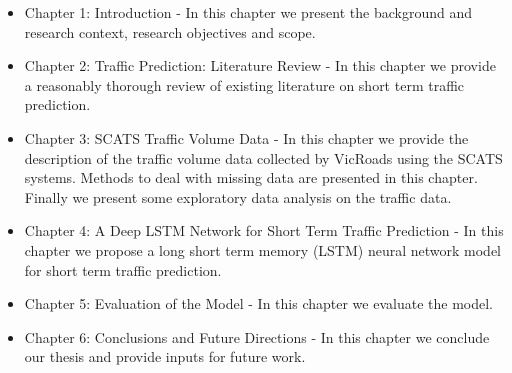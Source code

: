 \begin{itemize}
\item Chapter 1: Introduction - In this chapter we present the background and research context,
research objectives and scope.

\item Chapter 2: Traffic Prediction: Literature Review - In this chapter we provide a reasonably
thorough review of existing literature on short term traffic prediction.

\item Chapter 3: SCATS Traffic Volume Data - In this chapter we provide the description of the
traffic volume data collected by VicRoads using the SCATS systems. Methods to deal with missing
data are presented in this chapter. Finally we present some exploratory data analysis on the
traffic data.

\item Chapter 4: A Deep LSTM Network for Short Term Traffic Prediction - In this chapter we propose
a long short term memory (LSTM) neural network model for short term traffic prediction.

\item Chapter 5: Evaluation of the Model - In this chapter we evaluate the model.

\item Chapter 6: Conclusions and Future Directions - In this chapter we conclude our thesis and
provide inputs for future work.
\end{itemize}
